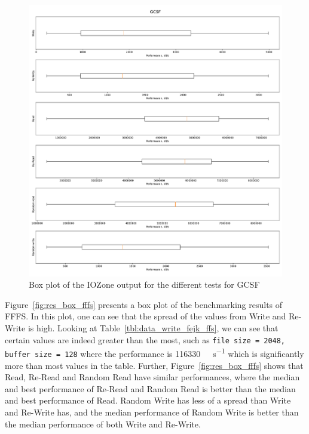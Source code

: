 \begin{figure}[!htb]
	\label{fig:res_box_gcsf}
	\begin{center}
		\includegraphics[width=1.0\textwidth]{figures/benchmarking/gcsf/GCSF-box.pdf}
	\end{center}
	\caption{Box plot of the IOZone output for the different tests for \gls{GCSF}}
\end{figure}

Figure~\ref{fig:res_box_fffs} presents a box plot of the benchmarking results of \gls{FFFS}. In this plot, one can see that the spread of the values from Write and Re-Write is high. Looking at Table~\ref{tbl:data_write_fejk_ffs}, we can see that certain values are indeed greater than the most, such as \texttt{file size = 2048, buffer size = 128} where the performance is \SI[per-mode = symbol]{116330}{\kilo\byte\per\second} which is significantly more than most values in the table. Further, Figure~\ref{fig:res_box_fffs} shows that Read, Re-Read and Random Read have similar performances, where the median and best performance of Re-Read and Random Read is better than the median and best performance of Read. Random Write has less of a spread than Write and Re-Write has, and the median performance of Random Write is better than the median performance of both Write and Re-Write.

